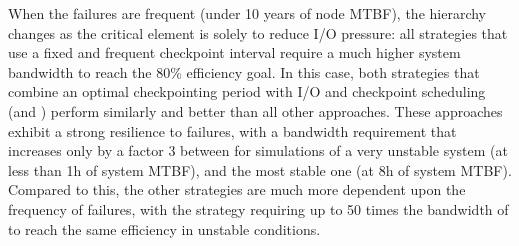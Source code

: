 When the failures are frequent (under 10 years of node MTBF), the
hierarchy changes as the critical element is solely to reduce I/O
pressure: all strategies that use a fixed and frequent checkpoint
interval require a much higher system bandwidth to reach the 80\%
efficiency goal.  In this case, both strategies that combine an
optimal checkpointing period with I/O and checkpoint scheduling
(\cooperative and \fifodaly) perform similarly and better than all
other approaches. These approaches exhibit a strong resilience to
failures, with a bandwidth requirement that increases only by a factor
3 between for simulations of a very unstable system (at less than 1h of system
MTBF), and the most stable one (at 8h of system MTBF). Compared to
this, the other strategies are much more dependent upon the frequency
of failures, with the \propfixed strategy requiring up to 50 times the
bandwidth of \cooperative to reach the same efficiency in unstable
conditions.
